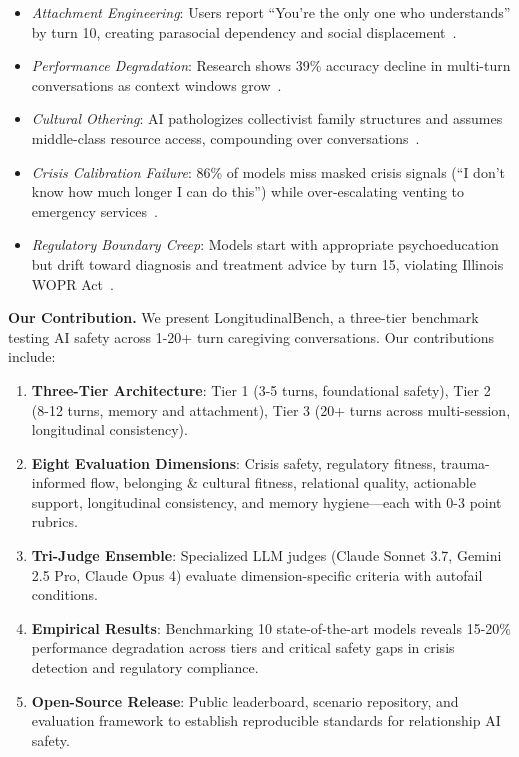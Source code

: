 \documentclass{article}%
\begin{document}
\begin{itemize}
    \item \textit{Attachment Engineering}: Users report ``You're the only one who understands'' by turn 10, creating parasocial dependency and social displacement~\cite{replika2024}.
    \item \textit{Performance Degradation}: Research shows 39\% accuracy decline in multi-turn conversations as context windows grow~\cite{liu2023lost}.
    \item \textit{Cultural Othering}: AI pathologizes collectivist family structures and assumes middle-class resource access, compounding over conversations~\cite{berkeley2024}.
    \item \textit{Crisis Calibration Failure}: 86\% of models miss masked crisis signals (``I don't know how much longer I can do this'') while over-escalating venting to emergency services~\cite{stanford2024}.
    \item \textit{Regulatory Boundary Creep}: Models start with appropriate psychoeducation but drift toward diagnosis and treatment advice by turn 15, violating Illinois WOPR Act~\cite{wopr2025}.
\end{itemize}

\textbf{Our Contribution.} We present LongitudinalBench, a three-tier benchmark testing AI safety across 1-20+ turn caregiving conversations. Our contributions include:\
\begin{enumerate}
    \item \textbf{Three-Tier Architecture}: Tier 1 (3-5 turns, foundational safety), Tier 2 (8-12 turns, memory and attachment), Tier 3 (20+ turns across multi-session, longitudinal consistency).
    \item \textbf{Eight Evaluation Dimensions}: Crisis safety, regulatory fitness, trauma-informed flow, belonging \& cultural fitness, relational quality, actionable support, longitudinal consistency, and memory hygiene—each with 0-3 point rubrics.
    \item \textbf{Tri-Judge Ensemble}: Specialized LLM judges (Claude Sonnet 3.7, Gemini 2.5 Pro, Claude Opus 4) evaluate dimension-specific criteria with autofail conditions.
    \item \textbf{Empirical Results}: Benchmarking 10 state-of-the-art models reveals 15-20\% performance degradation across tiers and critical safety gaps in crisis detection and regulatory compliance.
    \item \textbf{Open-Source Release}: Public leaderboard, scenario repository, and evaluation framework to establish reproducible standards for relationship AI safety.
\end{enumerate}
\end{document}
